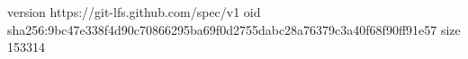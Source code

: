 version https://git-lfs.github.com/spec/v1
oid sha256:9bc47e338f4d90c70866295ba69f0d2755dabc28a76379c3a40f68f90ff91e57
size 153314

